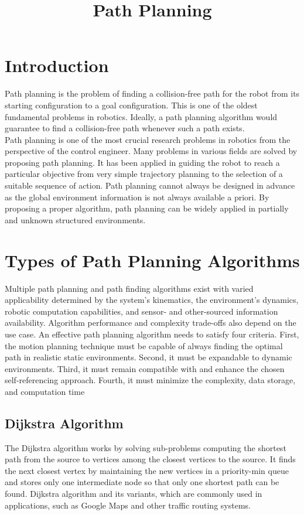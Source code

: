 \documentclass[11pt]{article}
\title{Path Planning}
\date{}
\begin{document}
\maketitle

\section{Introduction}
Path planning is the problem of finding a collision-free path for the robot from its starting configuration to a goal configuration. This is one of the oldest fundamental problems in robotics. Ideally, a path planning algorithm would guarantee to find a collision-free path whenever such a path exists.\\
Path planning is one of the most crucial research problems in robotics from the perspective of the control engineer. Many problems in various fields are solved by proposing path planning. It has been applied in guiding the robot to reach a particular objective from very simple trajectory planning to the selection of a suitable sequence of action. Path planning cannot always be designed in advance as the global environment information is not always available a priori. By proposing a proper algorithm, path planning can be widely applied in partially and unknown structured environments.
\section{Types of Path Planning Algorithms}
Multiple path planning and path finding
algorithms exist with varied applicability determined by the system’s kinematics, the
environment’s dynamics, robotic computation capabilities, and sensor- and other-sourced
information availability. Algorithm performance and complexity trade-offs also depend on
the use case.
An effective path planning algorithm needs to satisfy four criteria. First, the motion
planning technique must be capable of always finding the optimal path in realistic static
environments. Second, it must be expandable to dynamic environments. Third, it must
remain compatible with and enhance the chosen self-referencing approach. Fourth, it must
minimize the complexity, data storage, and computation time
\subsection{Dijkstra Algorithm}
The Dijkstra algorithm works by solving sub-problems computing the shortest path
from the source to vertices among the closest vertices to the source. It finds the next
closest vertex by maintaining the new vertices in a priority-min queue and stores only one
intermediate node so that only one shortest path can be found.
Dijkstra algorithm and its variants, which are commonly
used in applications, such as Google Maps and other traffic routing systems.
\end{document}
